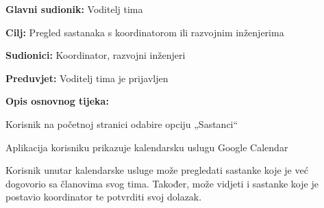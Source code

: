 							\noindent {}
							\begin{packed_item}
		
								\item \textbf{Glavni sudionik:} Voditelj tima
								\item  \textbf{Cilj:} Pregled sastanaka s koordinatorom ili razvojnim inženjerima
								\item  \textbf{Sudionici:} Koordinator, razvojni inženjeri
								\item  \textbf{Preduvjet:}  Voditelj tima je prijavljen
								\item  \textbf{Opis osnovnog tijeka:}
		
								\item[] \begin{packed_enum}
                                   \item Korisnik na početnoj stranici odabire opciju „Sastanci“
                                   \item Aplikacija korisniku prikazuje kalendarsku uslugu Google Calendar
                                   \item Korisnik unutar kalendarske usluge može pregledati sastanke koje je već dogovorio sa članovima svog tima. Također, može vidjeti i sastanke koje je postavio koordinator te potvrditi svoj dolazak.
                                       \end{packed_enum}
		
							\end{packed_item}


